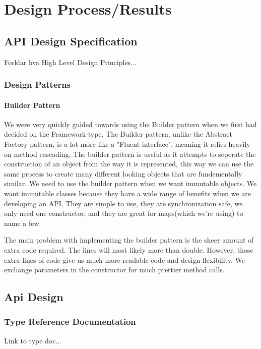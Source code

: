 \documentclass[12pt]{article}
\begin{document}
\section{Design Process/Results}

    \subsection{API Design Specification}
    Forklar hva High Level Design Principles...

        \subsubsection{Design Patterns}

        \paragraph{Builder Pattern}
        We were very quickly guided towards using the Builder pattern when we first had decided on the Framework-type. The Builder pattern, unlike the Abstract Factory pattern, is a lot more like a "Fluent interface", meaning it relies heavily on method cascading.
        The builder pattern is useful as it attempts to seperate the construction of an object from the way it is represented, this way we can use the same process to create many different looking objects that are fundementally similar.
        We need to use the builder pattern when we want immutable objects. We want immutable classes because they have a wide range of benefits when we are developing an API. They are simple to use, they are synchronization safe, we only need one constructor, and they are great for maps(which we're using) to name a few.

        The main problem with implementing the builder pattern is the sheer amount of extra code required. The lines will most likely more than double. However, those extra lines of code give us much more readable code and design flexibility. We exchange parameters in the constructor for much prettier method calls.

    \subsection{Api Design}

        \subsubsection{Type Reference Documentation}
        Link to type doc...
\end{document}
